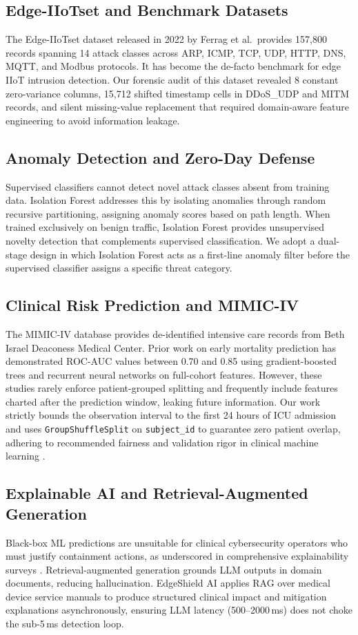 \documentclass[conference]{IEEEtran}
\begin{document}
\subsection{Edge-IIoTset and Benchmark Datasets}
The Edge-IIoTset dataset \cite{edgeiiotset} released in 2022 by Ferrag et al.\ provides 157,800 records spanning 14 attack classes across ARP, ICMP, TCP, UDP, HTTP, DNS, MQTT, and Modbus protocols. It has become the de-facto benchmark for edge IIoT intrusion detection. Our forensic audit of this dataset revealed 8 constant zero-variance columns, 15,712 shifted timestamp cells in DDoS\_UDP and MITM records, and silent missing-value replacement that required domain-aware feature engineering to avoid information leakage.

\subsection{Anomaly Detection and Zero-Day Defense}
Supervised classifiers cannot detect novel attack classes absent from training data. Isolation Forest \cite{isolationforest} addresses this by isolating anomalies through random recursive partitioning, assigning anomaly scores based on path length. When trained exclusively on benign traffic, Isolation Forest provides unsupervised novelty detection that complements supervised classification. We adopt a dual-stage design in which Isolation Forest acts as a first-line anomaly filter before the supervised classifier assigns a specific threat category.

\subsection{Clinical Risk Prediction and MIMIC-IV}
The MIMIC-IV database \cite{mimiciv} provides de-identified intensive care records from Beth Israel Deaconess Medical Center. Prior work on early mortality prediction has demonstrated ROC-AUC values between 0.70 and 0.85 using gradient-boosted trees and recurrent neural networks on full-cohort features. However, these studies rarely enforce patient-grouped splitting and frequently include features charted after the prediction window, leaking future information. Our work strictly bounds the observation interval to the first 24 hours of ICU admission and uses \texttt{GroupShuffleSplit} on \texttt{subject\_id} to guarantee zero patient overlap, adhering to recommended fairness and validation rigor in clinical machine learning \cite{clinicalml}.

\subsection{Explainable AI and Retrieval-Augmented Generation}
Black-box ML predictions are unsuitable for clinical cybersecurity operators who must justify containment actions, as underscored in comprehensive explainability surveys \cite{explainable}. Retrieval-augmented generation \cite{rag} grounds LLM outputs in domain documents, reducing hallucination. EdgeShield AI applies RAG over medical device service manuals to produce structured clinical impact and mitigation explanations asynchronously, ensuring LLM latency (500--2000\,ms) does not choke the sub-5\,ms detection loop.
\end{document}
